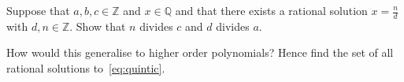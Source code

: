 {\begin{enumerate}
            Suppose that $a,b,c\in\mathbb{Z}$ and $x\in\mathbb{Q}$ and that
            there exists a rational solution $x=\frac{n}{d}$ with
            $d,n\in\mathbb{Z}$. Show that $n$ divides $c$ and $d$ divides $a$.

            How would this generalise to higher order polynomials? Hence find
            the set of all rational solutions to~\eqref{eq:quintic}.
    \end{enumerate}
}

